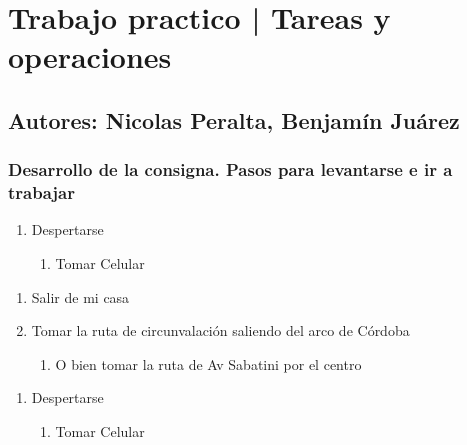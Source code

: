 \section*{Trabajo practico | Tareas y operaciones}

\subsection*{Autores: Nicolas Peralta, Benjamín Juárez}

\subsubsection*{Desarrollo de la consigna. Pasos para levantarse e ir a trabajar}



\begin{enumerate}
\def\labelenumi{\arabic{enumi}.}
\item Despertarse
    \begin{enumerate}
    \def\labelenumii{\arabic{enumii}.}
    \item Tomar Celular
    \end{enumerate}
\end{enumerate}

\begin{enumerate}
\def\labelenumi{\arabic{enumi}.}
\item Salir de mi casa
\item Tomar la ruta de circunvalación saliendo del arco de Córdoba 
    \begin{enumerate}
    \def\labelenumi{\arabic{enumi}.}
    \item O bien tomar la ruta de Av Sabatini por el centro
    \end{enumerate}
\end{enumerate}


\begin{enumerate}
\def\labelenumi{\arabic{enumi}.}
\item Despertarse
    \begin{enumerate}
    \def\labelenumii{\arabic{enumii}.}
    \item Tomar Celular
    \end{enumerate}
\end{enumerate}



